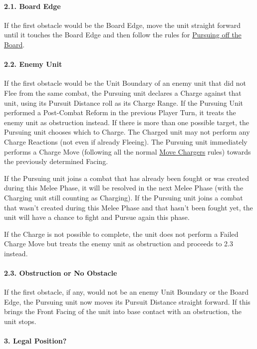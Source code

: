 \paragraph{2.1. Board Edge}

If the first obstacle would be the Board Edge, move the unit straight forward until it touches the Board Edge and then follow the rules for \hyperref[pursuing_off_the_board]{Pursuing off the Board}.

\paragraph{2.2. Enemy Unit}

If the first obstacle would be the Unit Boundary of an enemy unit that did not Flee from the same combat, the Pursuing unit declares a Charge against that unit, using its Pursuit Distance roll as its Charge Range. If the Pursuing Unit performed a Post-Combat Reform in the previous Player Turn, it treats the enemy unit as obstruction instead. If there is more than one possible target, the Pursuing unit chooses which to Charge. The Charged unit may not perform any Charge Reactions (not even if already Fleeing). The Pursuing unit immediately performs a Charge Move (following all the normal \hyperref[move_chargers]{Move Chargers} rules) towards the previously determined Facing.
\par
If the Pursuing unit joins a combat that has already been fought or was created during this Melee Phase, it will be resolved in the next Melee Phase (with the Charging unit still counting as Charging). If the Pursuing unit joins a combat that wasn't created during this Melee Phase and that hasn't been fought yet, the unit will have a chance to fight and Pursue again this phase.
\par
If the Charge is not possible to complete, the unit does not perform a Failed Charge Move but treats the enemy unit as obstruction and proceeds to 2.3 instead.

\paragraph{2.3. Obstruction or No Obstacle}

If the first obstacle, if any, would not be an enemy Unit Boundary or the Board Edge, the Pursuing unit now moves its Pursuit Distance straight forward. If this brings the Front Facing of the unit into base contact with an obstruction, the unit stops.

\paragraph{3. Legal Position?}


